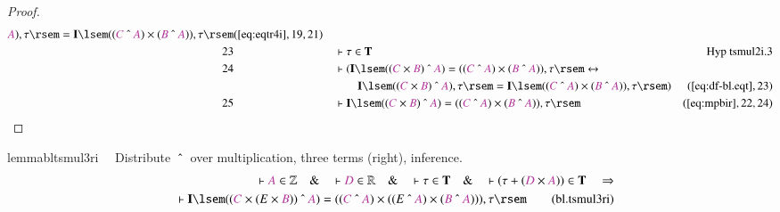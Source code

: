 \begin{proof}
\begin{align}
      \mc{A} ) , \tau \rsem = \mathbf{I} \lsem ( ( \mc{C}
      ~\string^~ \mc{A} ) \times ( \mc{B} ~\string^~ \mc{A}
      ) ) , \tau \rsem&(\mbox{\ref{eq:eqtr4i}},19,21)\notag
  \\ 23 &&  & \vdash \tau \in
      \mathbf{T}&\text{Hyp~tsmul2i.3}\notag%
  \\ 24 &&  & \vdash ( \mathbf{I} \lsem ( ( \mc{C} \times \mc{B} ) ~\string^~
      \mc{A} ) = ( ( \mc{C} ~\string^~ \mc{A} ) \times (
      \mc{B} ~\string^~ \mc{A} ) ) , \tau \rsem
      \leftrightarrow  \notag \\ & & & \qquad
     \mathbf{I} \lsem ( ( \mc{C} \times
      \mc{B} ) ~\string^~ \mc{A} ) , \tau \rsem =
      \mathbf{I} \lsem ( ( \mc{C} ~\string^~ \mc{A} ) \times
      ( \mc{B} ~\string^~ \mc{A} ) ) , \tau \rsem
      )&(\mbox{\ref{eq:df-bl.eqt}},23)\notag
  \\ 25 &&  & \vdash \mathbf{I} \lsem ( ( \mc{C} \times \mc{B} ) ~\string^~
      \mc{A} ) = ( ( \mc{C} ~\string^~ \mc{A} ) \times (
      \mc{B} ~\string^~ \mc{A} ) ) , \tau
      \rsem&(\mbox{\ref{eq:mpbir}},22,24)\notag
\end{align}
\end{proof}

\begin{restatable}{lemma}{bltsmul3ri}~~ Distribute $~\string^~$ over
multiplication, three terms (right), inference.
\begin{align}
\vdash \mc{A} \in \mathbb{Z}\quad\&\quad \vdash \mc{D} \in
    \mathbb{R}\quad\&\quad \vdash \tau \in \mathbf{T}\quad\&\quad \vdash ( \tau
    + ( \mc{D} \times \mc{A} ) ) \in \mathbf{T}\quad\Rightarrow  \notag \\ %
     \quad \vdash
    \mathbf{I} \lsem ( ( \mc{C} \times ( E \times \mc{B} ) ) ~\string^~ \mc{A} )
    = ( ( \mc{C} ~\string^~ \mc{A} ) \times ( ( E ~\string^~ \mc{A} ) \times (
    \mc{B} ~\string^~ \mc{A} ) ) ) , \tau
    \rsem\label{eq:bl.tsmul3ri}\tag{bl.tsmul3ri}
\end{align}
\end{restatable}

